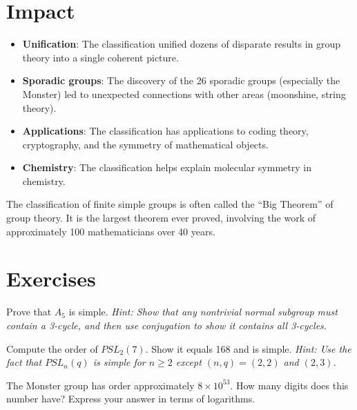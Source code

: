 \section{Impact}

\begin{itemize}
\item \textbf{Unification}: The classification unified dozens of disparate results in group theory into a single coherent picture.
\item \textbf{Sporadic groups}: The discovery of the 26 sporadic groups (especially the Monster) led to unexpected connections with other areas (moonshine, string theory).
\item \textbf{Applications}: The classification has applications to coding theory, cryptography, and the symmetry of mathematical objects.
\item \textbf{Chemistry}: The classification helps explain molecular symmetry in chemistry.
\end{itemize}

\begin{highlightbox}
The classification of finite simple groups is often called the ``Big Theorem'' of group theory. It is the largest theorem ever proved, involving the work of approximately 100 mathematicians over 40 years.
\end{highlightbox}

\section{Exercises}

\begin{exercise}[Basic]
Prove that $A_5$ is simple. \emph{Hint: Show that any nontrivial normal subgroup must contain a 3-cycle, and then use conjugation to show it contains all 3-cycles.}
\end{exercise}

\begin{exercise}[Intermediate]
Compute the order of $PSL_2(7)$. Show it equals 168 and is simple. \emph{Hint: Use the fact that $PSL_n(q)$ is simple for $n \geq 2$ except $(n,q) = (2,2)$ and $(2,3)$.}
\end{exercise}

\begin{exercise}[Challenge]
The Monster group has order approximately $8 \times 10^{53}$. How many digits does this number have? Express your answer in terms of logarithms.
\end{exercise}

